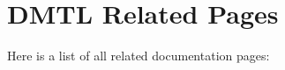 \section{DMTL Related Pages}
Here is a list of all related documentation pages:\begin{CompactList}
\item {}

\end{CompactList}
